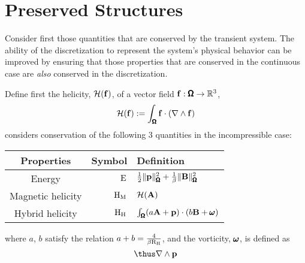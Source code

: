\section{Preserved Structures}
    
    Consider first those quantities that are conserved by the transient system. The ability of the discretization to represent the system's physical behavior can be improved by ensuring that those properties that are conserved in the continuous case are \emph{also} conserved in the discretization. \BA{[Ref, ...]}

    Define first the helicity, $\mathcal{H}(\mathbf{f})$, of a vector field $\mathbf{f} : \pmb{\mathsf{\Omega}} \rightarrow \mathbb{R}^{3}$,
    \begin{equation}
        \mathcal{H}(\mathbf{f})  :=  \int_{\pmb{\mathsf{\Omega}}}\mathbf{f}\cdot(\nabla\wedge\mathbf{f})
    \end{equation}
    \cite{LHF22} considers conservation of the following 3 quantities in the incompressible case: 
    \begin{center}\begin{tabular}{ c | r l }
        Properties  &  Symbol  &  Definition  \\
        \hline\hline
        Energy  &  $\mathrm{E}$  &  $\frac{1}{2}\|\mathbf{p}\|_{\pmb{\mathsf{\Omega}}}^{2} + \frac{1}{\beta}\|\mathbf{B}\|_{\pmb{\mathsf{\Omega}}}^{2}$  \\
        Magnetic helicity  &  $\mathrm{H}_{\mathrm{M}}$  &  $\mathcal{H}(\mathbf{A})$  \\
        Hybrid helicity  &  $\mathrm{H}_{\mathrm{H}}$  &  $\int_{\pmb{\mathsf{\Omega}}}(a\mathbf{A} + \mathbf{p})\cdot(b\mathbf{B} + \pmb{\mathsf{\omega}})$
    \end{tabular}\end{center}
    where $a$, $b$ satisfy the relation $a + b  =  \frac{4}{\beta\mathrm{R}_{\mathrm{H}}}$,  and the vorticity, $\pmb{\mathsf{\omega}}$, is defined as
    \begin{equation}
        \thus \nabla\wedge\bfp
    \end{equation}
    
